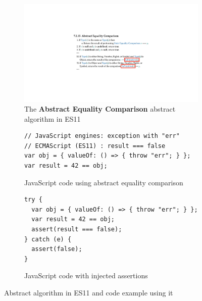 \begin{figure}[t]
  \centering
  \begin{subfigure}[t]{0.48\textwidth}
    \includegraphics[width=\textwidth]{img/example-algo.pdf}
\vspace*{-.5em}
    \caption{The \textbf{Abstract Equality Comparison} abstract algorithm in
    ES11}
    \label{fig:example-algo}
  \end{subfigure}
  \begin{subfigure}[t]{0.43\textwidth}
    \begin{lstlisting}[style=myJSstyle]
// JavaScript engines: exception with "err"
// ECMAScript (ES11) : result === false
var obj = { valueOf: () => { throw "err"; } };
var result = 42 == obj;
    \end{lstlisting}
\vspace*{-.5em}
    \caption{JavaScript code using abstract equality comparison}
    \label{fig:example-js}
  \end{subfigure}
  \begin{subfigure}[t]{0.45\textwidth}
    \begin{lstlisting}[style=myJSstyle]
try {
  var obj = { valueOf: () => { throw "err"; } };
  var result = 42 == obj;
  assert(result === false);
} catch (e) {
  assert(false);
}
    \end{lstlisting}
\vspace*{-1em}
    \caption{JavaScript code with injected assertions}
    \label{fig:example-injected}
  \end{subfigure}
  \caption{Abstract algorithm in ES11 and code example using it}
  \label{fig:example}
  \vspace*{-1em}
\end{figure}

